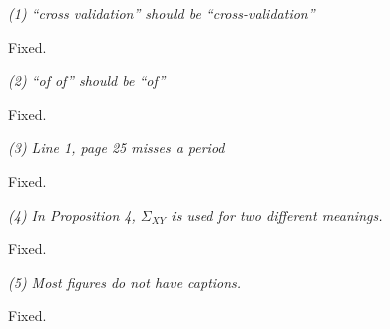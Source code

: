 \documentclass[11pt]{article}
\begin{document}
\emph{(1) ``cross validation'' should be ``cross-validation''}

Fixed.

\emph{(2) ``of of'' should be ``of''}

Fixed.

\emph{(3) Line 1, page 25 misses a period}

Fixed.

\emph{(4) In Proposition 4, $\Sigma_{XY}$ is used for two different meanings.}

Fixed.

\emph{(5) Most figures do not have captions.}

Fixed.




\end{document}
